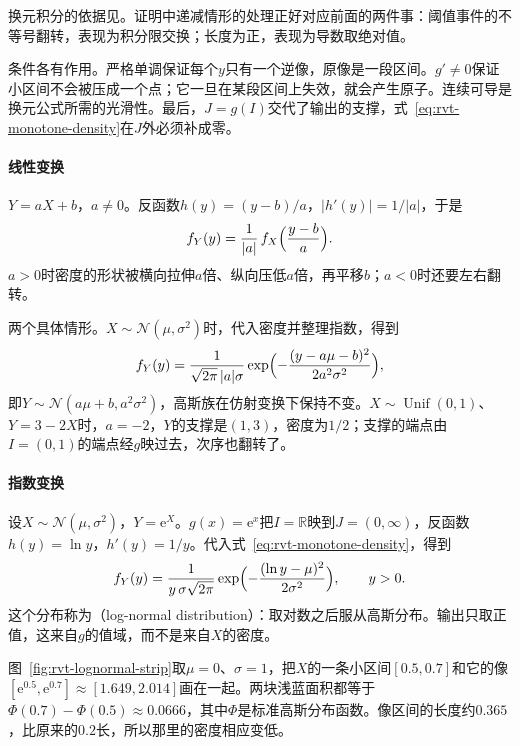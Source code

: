 换元积分的依据见。证明中递减情形的处理正好对应前面的两件事：阈值事件的不等号翻转，表现为积分限交换；长度为正，表现为导数取绝对值。

条件各有作用。严格单调保证每个$y$只有一个逆像，原像是一段区间。$g'\neq0$保证小区间不会被压成一个点；它一旦在某段区间上失效，就会产生原子。连续可导是换元公式所需的光滑性。最后，$J=g(I)$交代了输出的支撑，式~\eqref{eq:rvt-monotone-density}在$J$外必须补成零。

\paragraph{线性变换}
$Y=aX+b$，$a\neq0$。反函数$h(y)=(y-b)/a$，$\lvert h'(y)\rvert=1/\lvert a\rvert$，于是
\begin{equation}
 f_Y(y)=\frac{1}{\lvert a\rvert}\,f_X\Bigl(\frac{y-b}{a}\Bigr) .
 \label{eq:rvt-linear-density}
\end{equation}
$a>0$时密度的形状被横向拉伸$a$倍、纵向压低$a$倍，再平移$b$；$a<0$时还要左右翻转。

两个具体情形。$X\sim\mathcal{N}(\mu,\sigma^{2})$时，代入密度并整理指数，得到
\[
 f_Y(y)=\frac{1}{\sqrt{2\pi}\,\lvert a\rvert\sigma}\exp\Bigl(-\frac{(y-a\mu-b)^2}{2a^2\sigma^2}\Bigr),
\]
即$Y\sim\mathcal{N}(a\mu+b,a^2\sigma^2)$，高斯族在仿射变换下保持不变。$X\sim\operatorname{Unif}(0,1)$、$Y=3-2X$时，$a=-2$，$Y$的支撑是$(1,3)$，密度为$1/2$；支撑的端点由$I=(0,1)$的端点经$g$映过去，次序也翻转了。

\paragraph{指数变换}
设$X\sim\mathcal{N}(\mu,\sigma^{2})$，$Y=\mathrm{e}^{X}$。$g(x)=\mathrm{e}^{x}$把$I=\mathbb{R}$映到$J=(0,\infty)$，反函数$h(y)=\ln y$，$h'(y)=1/y$。代入式~\eqref{eq:rvt-monotone-density}，得到
\begin{equation}
 f_Y(y)=\frac{1}{y\,\sigma\sqrt{2\pi}}\exp\Bigl(-\frac{(\ln y-\mu)^2}{2\sigma^2}\Bigr),\qquad y>0 .
 \label{eq:rvt-lognormal}
\end{equation}
这个分布称为（log-normal distribution）：取对数之后服从高斯分布。输出只取正值，这来自$g$的值域，而不是来自$X$的密度。

图~\ref{fig:rvt-lognormal-strip}取$\mu=0$、$\sigma=1$，把$X$的一条小区间$[0.5,0.7]$和它的像$[\mathrm{e}^{0.5},\mathrm{e}^{0.7}]\approx[1.649,2.014]$画在一起。两块浅蓝面积都等于$\Phi(0.7)-\Phi(0.5)\approx0.0666$，其中$\Phi$是标准高斯分布函数。像区间的长度约$0.365$，比原来的$0.2$长，所以那里的密度相应变低。

